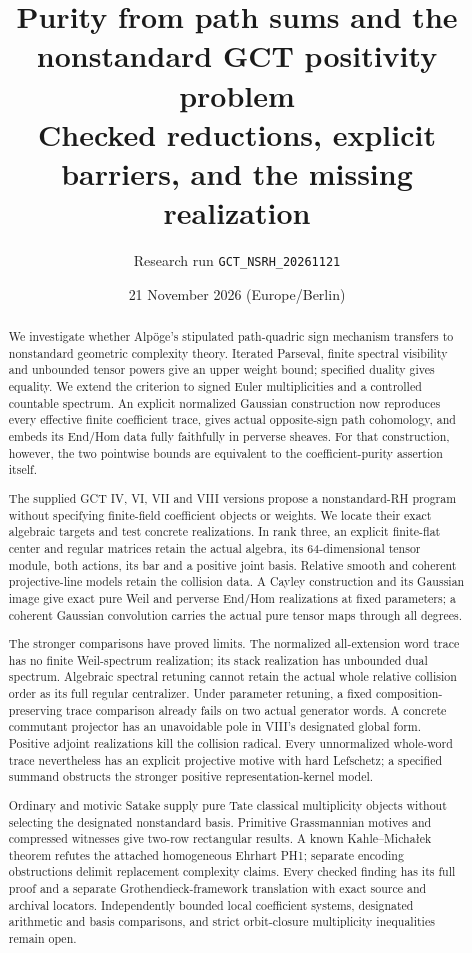 \documentclass[11pt,a4paper]{article}
\title{Purity from path sums and the nonstandard GCT positivity problem\\[4pt]\large Checked reductions, explicit barriers, and the missing realization}
\author{Research run \texttt{GCT\_NSRH\_20261121}}
\date{21 November 2026 (Europe/Berlin)}
\theoremstyle{named}\newtheorem{finding}{Finding}[section]
\theoremstyle{definition}\newtheorem{definition}[finding]{Definition}
\theoremstyle{remark}\newtheorem{remark}[finding]{Remark}
\begin{document}
\maketitle
\begin{abstract}
We investigate whether Alp\"oge's stipulated path-quadric sign mechanism transfers to nonstandard geometric complexity theory. Iterated Parseval, finite spectral visibility and unbounded tensor powers give an upper weight bound; specified duality gives equality. We extend the criterion to signed Euler multiplicities and a controlled countable spectrum. An explicit normalized Gaussian construction now reproduces every effective finite coefficient trace, gives actual opposite-sign path cohomology, and embeds its End/Hom data fully faithfully in perverse sheaves. For that construction, however, the two pointwise bounds are equivalent to the coefficient-purity assertion itself.

The supplied GCT IV, VI, VII and VIII versions propose a nonstandard-RH program without specifying finite-field coefficient objects or weights. We locate their exact algebraic targets and test concrete realizations. In rank three, an explicit finite-flat center and regular matrices retain the actual algebra, its 64-dimensional tensor module, both actions, its bar and a positive joint basis. Relative smooth and coherent projective-line models retain the collision data. A Cayley construction and its Gaussian image give exact pure Weil and perverse End/Hom realizations at fixed parameters; a coherent Gaussian convolution carries the actual pure tensor maps through all degrees.

The stronger comparisons have proved limits. The normalized all-extension word trace has no finite Weil-spectrum realization; its stack realization has unbounded dual spectrum. Algebraic spectral retuning cannot retain the actual whole relative collision order as its full regular centralizer. Under parameter retuning, a fixed composition-preserving trace comparison already fails on two actual generator words. A concrete commutant projector has an unavoidable pole in VIII's designated global form. Positive adjoint realizations kill the collision radical. Every unnormalized whole-word trace nevertheless has an explicit projective motive with hard Lefschetz; a specified summand obstructs the stronger positive representation-kernel model.

Ordinary and motivic Satake supply pure Tate classical multiplicity objects without selecting the designated nonstandard basis. Primitive Grassmannian motives and compressed witnesses give two-row rectangular results. A known Kahle--Micha{\l}ek theorem refutes the attached homogeneous Ehrhart PH1; separate encoding obstructions delimit replacement complexity claims. Every checked finding has its full proof and a separate Grothendieck-framework translation with exact source and archival locators. Independently bounded local coefficient systems, designated arithmetic and basis comparisons, and strict orbit-closure multiplicity inequalities remain open.
\end{abstract}
\end{document}
